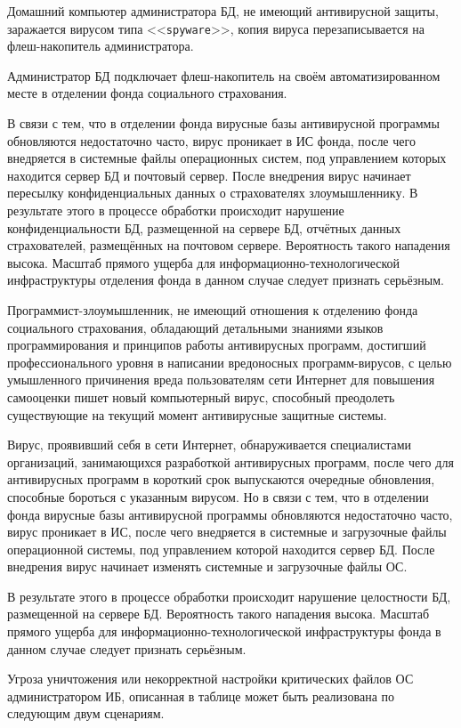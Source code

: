 Домашний компьютер администратора БД, не имеющий антивирусной защиты,
заражается вирусом типа <<\texttt{spyware}>>, копия вируса
перезаписывается на флеш-накопитель администратора.

Администратор БД подключает флеш-накопитель на своём
автоматизированном месте в отделении фонда социального страхования.

В связи с тем, что в отделении фонда вирусные базы антивирусной
программы обновляются недостаточно часто, вирус проникает в ИС фонда,
после чего внедряется в системные файлы операционных систем, под
управлением которых находится сервер БД и почтовый сервер. После
внедрения вирус начинает пересылку конфиденциальных данных о
страхователях злоумышленнику. В результате этого в процессе обработки
происходит нарушение конфиденциальности БД, размещенной на сервере БД,
отчётных данных страхователей, размещённых на почтовом
сервере. Вероятность такого нападения высока. Масштаб прямого ущерба
для информационно-технологической инфраструктуры отделения фонда в
данном случае следует признать серьёзным.

\point Программист-злоумышленник, не имеющий отношения к отделению
фонда социального страхования, обладающий детальными знаниями языков
программирования и принципов работы антивирусных программ, достигший
профессионального уровня в написании вредоносных программ-вирусов, с
целью умышленного причинения вреда пользователям сети Интернет для
повышения самооценки пишет новый компьютерный вирус, способный
преодолеть существующие на текущий момент антивирусные защитные
системы.

Вирус, проявивший себя в сети Интернет, обнаруживается специалистами
организаций, занимающихся разработкой антивирусных программ, после
чего для антивирусных программ в короткий срок выпускаются очередные
обновления, способные бороться с указанным вирусом. Но в связи с тем,
что в отделении фонда вирусные базы антивирусной программы обновляются
недостаточно часто, вирус проникает в ИС, после чего внедряется в
системные и загрузочные файлы операционной системы, под управлением
которой находится сервер БД. После внедрения вирус начинает изменять
системные и загрузочные файлы ОС.

В результате этого в процессе обработки происходит нарушение
целостности БД, размещенной на сервере БД. Вероятность такого
нападения высока. Масштаб прямого ущерба для
информационно-технологической инфраструктуры фонда в данном случае
следует признать серьёзным.

\point Угроза уничтожения или некорректной настройки критических
файлов ОС администратором ИБ, описанная в таблице может быть
реализована по следующим двум сценариям.

